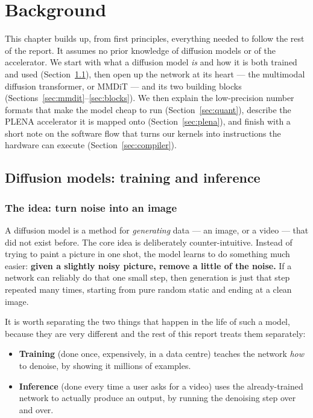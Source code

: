 \documentclass[11pt]{report}
\begin{document}
\chapter{Background}
\label{ch:background}

This chapter builds up, from first principles, everything needed to
follow the rest of the report. It assumes no prior knowledge of diffusion
models or of the accelerator. We start with what a diffusion model
\emph{is} and how it is both trained and used (Section~\ref{sec:diffusion}),
then open up the network at its heart --- the multimodal diffusion
transformer, or MMDiT --- and its two building blocks
(Sections~\ref{sec:mmdit}--\ref{sec:blocks}). We then explain the
low-precision number formats that make the model cheap to run
(Section~\ref{sec:quant}), describe the PLENA accelerator it is mapped
onto (Section~\ref{sec:plena}), and finish with a short note on the
software flow that turns our kernels into instructions the hardware can
execute (Section~\ref{sec:compiler}).

\section{Diffusion models: training and inference}
\label{sec:diffusion}

\subsection{The idea: turn noise into an image}

A diffusion model is a method for \emph{generating} data --- an image, or
a video --- that did not exist before. The core idea is deliberately
counter-intuitive. Instead of trying to paint a picture in one shot, the
model learns to do something much easier: \textbf{given a slightly noisy
picture, remove a little of the noise.} If a network can reliably do that
one small step, then generation is just that step repeated many times,
starting from pure random static and ending at a clean image.

It is worth separating the two things that happen in the life of such a
model, because they are very different and the rest of this report treats
them separately:

\begin{itemize}
\item \textbf{Training} (done once, expensively, in a data centre) teaches
the network \emph{how} to denoise, by showing it millions of examples.
\item \textbf{Inference} (done every time a user asks for a video) uses
the already-trained network to actually produce an output, by running the
denoising step over and over.
\end{itemize}
\end{document}
